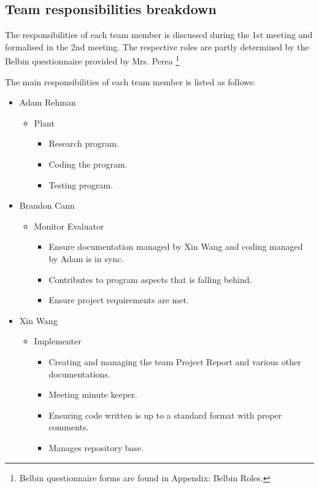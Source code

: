 \documentclass[12pt,a4paper]{article}
\begin{document}
	\subsection{Team responsibilities breakdown}
	The responsibilities of each team member is discussed during the 1st meeting and formalised in the 2nd meeting. The
	respective roles are partly determined by the Belbin questionnaire provided by Mrs. Perea 
	\footnote{Belbin questionnaire forms are found in Appendix: Belbin Roles.}
	\par
	The main responsibilities of each team member is listed as follows:
	\begin{itemize}
		\item Adam Rehman
		\begin{itemize}
			\item Plant
			\begin{itemize}
				\item Research program.
				\item Coding the program.
				\item Testing program.
			\end{itemize}
		\end{itemize}
		\item Brandon Cann
		\begin{itemize}
			\item Monitor Evaluator
			\begin{itemize}
				\item Ensure documentation managed by Xin Wang and coding managed by Adam is in sync.
				\item Contributes to program aspects that is falling behind.
				\item Ensure project requirements are met.
			\end{itemize}
		\end{itemize}
		\item Xin Wang
		\begin{itemize}
			\item Implementer
			\begin{itemize}
				\item Creating and managing the team Project Report and various other documentations.
				\item Meeting minute keeper.
				\item Ensuring code written is up to a standard format with proper comments.
				\item Manages repository base.
			\end{itemize}
		\end{itemize}
	\end{itemize}
\end{document}
